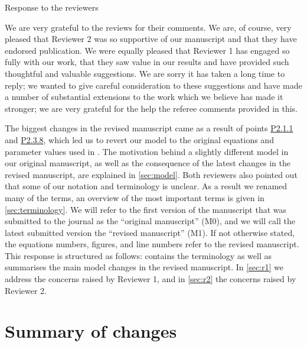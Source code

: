 \documentclass[utf8]{article}
\newcounter{point}[section]
\begin{document}

\begin{center}
	\Large Response to the reviewers
\end{center}
We are very grateful to the reviews for their comments.
We are, of course, very pleased that Reviewer 2 was so supportive of our manuscript and that they have endorsed publication.
We were equally pleased that Reviewer 1 has engaged so fully with our work, that they saw value in our results and have provided such thoughtful and valuable suggestions.
We are sorry it has taken a long time to reply; we wanted to give careful consideration to these suggestions and have made a number of substantial extensions to the work which we believe has made it stronger; we are very grateful for the help the referee comments provided in this.

The biggest changes in the revised manuscript came as a result of points \hyperref[p:biol]{P2.1.1} and \hyperref[p:gstar]{P2.3.8}, which led us to revert our model to the original equations and parameter values used in \cite{bose2011}.
The motivation behind a slightly different model in our original manuscript, as well as the consequence of the latest changes in the revised manuscript, are explained in \cref{sec:model}.
Both reviewers also pointed out that some of our notation and terminology is unclear.
As a result we renamed many of the terms, an overview of the most important terms is given in \cref{sec:terminology}.
We will refer to the first version of the manuscript that was submitted to the journal as the ``original manuscript'' (M0), and we will call the latest submitted version the ``revised manuscript'' (M1).
If not otherwise stated, the equations numbers, figures, and line numbers refer to the revised manuscript.
This response is structured as follows:
 contains the terminology as well as summarises the main model changes in the revised manuscript.
In \cref{sec:r1} we address the concerns raised by Reviewer 1, and in \cref{sec:r2} the concerns raised by Reviewer 2.


\section{Summary of changes}
\label{sec:sum}
\end{document}
